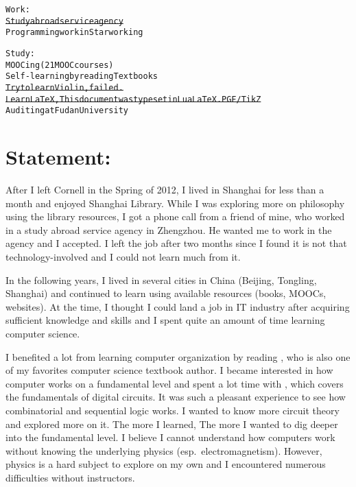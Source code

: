 


\usepackage[font={scriptsize,it}]{caption}
\usepackage{metalogo,alltt,soul,tikz,standalone,wrapfig,csquotes}
\usetikzlibrary{calc}
\usepackage{biblatex} %



\newcommand*{\onum}[1]{{\addfontfeatures{Numbers=OldStyle}#1}}
\newcommand*{\TikZ}{PGF/\kern1bpTi\kern.5bp\textit{k}Z}


	\begin{alltt}
		Work:
		\st{Study abroad service agency}
		Programming work in Starworking
		
		Study:
		MOOCing (21 MOOC courses)
		Self-learning by reading Textbooks
		\st{Try to learn Violin, failed.}
		\st{Learn LaTeX, This document was typeset in LuaLaTeX. PGF/TikZ}
		Auditing at Fudan University
	\end{alltt}
	
	\section*{Statement:}
	After I left Cornell in the Spring of 2012, I lived in Shanghai for less than a month and enjoyed Shanghai Library. While I was exploring more on philosophy using the library resources, I got a phone call from a friend of mine, who worked in a study abroad service agency in Zhengzhou. He wanted me to work in the agency and I accepted. I left the job after two months since I found it is not that technology-involved and I could not learn much from it.
	
	In the following years, I lived in several cities in China (Beijing, Tongling, Shanghai) and continued to learn using available resources (books, MOOCs, websites). At the time, I thought I could land a job in IT industry after acquiring sufficient knowledge and skills and I spent quite an amount of time learning computer science.
	
	I benefited a lot from learning computer organization by reading \textcite{COA8e}, who is also one of my favorites computer science textbook author. I became interested in how computer works on a fundamental level and spent a lot time with \textcite{LCDF}, which covers the fundamentals of digital circuits. It was such a pleasant experience to see how combinatorial and sequential logic works. I wanted to know more circuit theory and explored more on it. The more I learned, The more I wanted to dig deeper into the fundamental level. I believe I cannot understand how computers work without knowing the underlying physics (esp.\ electromagnetism). However, physics is a hard subject to explore on my own and I encountered numerous difficulties without instructors.
	

